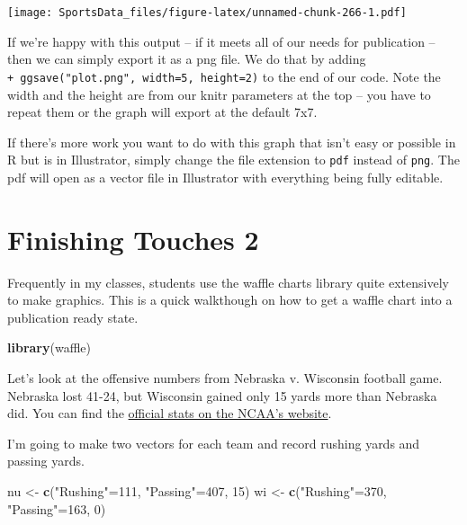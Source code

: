 \documentclass[]{book}
\newenvironment{Shaded}{\begin{snugshade}}{\end{snugshade}}
\newcommand{\DecValTok}[1]{\textcolor[rgb]{0.00,0.00,0.81}{#1}}
\newcommand{\KeywordTok}[1]{\textcolor[rgb]{0.13,0.29,0.53}{\textbf{#1}}}
\newcommand{\NormalTok}[1]{#1}
\newcommand{\StringTok}[1]{\textcolor[rgb]{0.31,0.60,0.02}{#1}}
\begin{document}
\texttt{[image: SportsData\_files/figure-latex/unnamed-chunk-266-1.pdf]}

If we're happy with this output -- if it meets all of our needs for publication -- then we can simply export it as a png file. We do that by adding \texttt{+\ ggsave("plot.png",\ width=5,\ height=2)} to the end of our code. Note the width and the height are from our knitr parameters at the top -- you have to repeat them or the graph will export at the default 7x7.

If there's more work you want to do with this graph that isn't easy or possible in R but is in Illustrator, simply change the file extension to \texttt{pdf} instead of \texttt{png}. The pdf will open as a vector file in Illustrator with everything being fully editable.

\hypertarget{finishing-touches-2}{%
\chapter{Finishing Touches 2}\label{finishing-touches-2}}

Frequently in my classes, students use the waffle charts library quite extensively to make graphics. This is a quick walkthough on how to get a waffle chart into a publication ready state.

\begin{Shaded}
\begin{Highlighting}[]
\KeywordTok{library}\NormalTok{(waffle)}
\end{Highlighting}
\end{Shaded}

Let's look at the offensive numbers from Nebraska v. Wisconsin football game. Nebraska lost 41-24, but Wisconsin gained only 15 yards more than Nebraska did. You can find the \href{https://www.ncaa.com/game/football/fbs/2018/10/06/nebraska-wisconsin/team-stats}{official stats on the NCAA's website}.

I'm going to make two vectors for each team and record rushing yards and passing yards.

\begin{Shaded}
\begin{Highlighting}[]
\NormalTok{nu <-}\StringTok{ }\KeywordTok{c}\NormalTok{(}\StringTok{"Rushing"}\NormalTok{=}\DecValTok{111}\NormalTok{, }\StringTok{"Passing"}\NormalTok{=}\DecValTok{407}\NormalTok{, }\DecValTok{15}\NormalTok{)}
\NormalTok{wi <-}\StringTok{ }\KeywordTok{c}\NormalTok{(}\StringTok{"Rushing"}\NormalTok{=}\DecValTok{370}\NormalTok{, }\StringTok{"Passing"}\NormalTok{=}\DecValTok{163}\NormalTok{, }\DecValTok{0}\NormalTok{)}
\end{Highlighting}
\end{Shaded}
\end{document}
